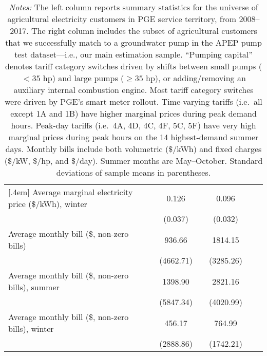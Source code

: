 \begin{table}
\begin{tabular}{lrcrcrr}
[.4em]
Average marginal electricity price (\$/kWh), winter && 0.126 && 0.096   \\
 && (0.037) && (0.032)   \\
[1.4em]
Average monthly bill (\$, non-zero bills) && 936.66 && 1814.15   \\
 && (4662.71) && (3285.26)   \\
[.4em]
Average monthly bill (\$, non-zero bills), summer && 1398.90 && 2821.16   \\
 && (5847.34) && (4020.99)   \\
[.4em]
Average monthly bill (\$, non-zero bills), winter && 456.17 && 764.99   \\
 && (2888.86) && (1742.21)   \\
[.2em]
\hline
\end{tabular}
\captionsetup{width=\textwidth}
\caption*{\scriptsize \emph{Notes:} The left column reports summary statistics 
for the universe of agricultural electricity customers in PGE service territory, from 2008--2017.
The right column includes the subset of agricultural customers that we successfully match to a 
groundwater pump in the APEP pump test dataset---i.e., our main estimation sample.
``Pumping capital'' denotes tariff category switches driven by shifts between small pumps ($<35$ hp) and 
large pumps ($\ge 35$ hp), or adding/removing an auxiliary internal combustion engine.
Most tariff category switches were driven by PGE's smart meter rollout.
Time-varying tariffs (i.e.\ all except 1A and 1B) have higher marginal prices during peak demand hours. 
Peak-day tariffs (i.e.\ 4A, 4D, 4C, 4F, 5C, 5F) have very high marginal prices during peak
hours on the 14 highest-demand summer days.
Monthly bills include both volumetric (\$/kWh) and fixed charges (\$/kW, \$/hp, and \$/day).
Summer months are May--October.
Standard deviations of sample means in parentheses.
}
\end{table}
